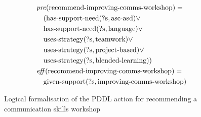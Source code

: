 \begin{figure}[t]
  \small  %
  \begin{align*}
  &\mathit{pre}(\text{recommend-improving-comms-workshop}) = \\
  &\quad (\text{has-support-need}(\text{?s}, \text{asc-asd}) \lor \\
  &\quad \text{has-support-need}(\text{?s}, \text{language}) \lor \\
  &\quad \text{uses-strategy}(\text{?s}, \text{teamwork}) \lor \\
  &\quad \text{uses-strategy}(\text{?s}, \text{project-based}) \lor \\
  &\quad \text{uses-strategy}(\text{?s}, \text{blended-learning})) \\
  &\mathit{eff}(\text{recommend-improving-comms-workshop}) = \\
  &\quad \text{given-support}(\text{?s}, \text{improving-comms-workshop})
  \end{align*}
  \caption{Logical formalisation of the PDDL action for recommending a communication skills workshop}\label{fig:improve-comms-workshop}
\end{figure}